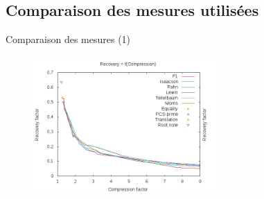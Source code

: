\documentclass[10pt]{beamer}
\begin{document}
\subsection{Comparaison des mesures utilisées}

\begin{frame}{Comparaison des mesures (1)}

\begin{figure}
\centering
\includegraphics[width = 7cm]{images/RfC77.jpg}
\end{figure}
\end{frame}
\end{document}
